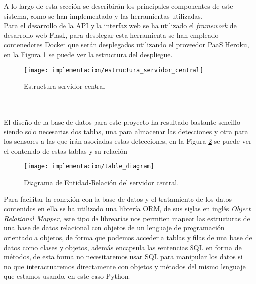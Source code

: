 \documentclass[../proyecto.tex]{subfiles}
\begin{document}
A lo largo de esta sección se describirán los principales componentes de este sistema, como se han implementado y las herramientas utilizadas.\\

Para el desarrollo de la API y la interfaz web se ha utilizado el \textit{framework} de desarrollo web Flask, para desplegar esta herramienta se han empleado contenedores Docker que serán desplegados utilizando el proveedor PaaS Heroku, en la Figura \ref{fig:estructura_servidor_central} se puede ver la estructura del despliegue.\\

\begin{figure}[H]
\centering
\texttt{[image: implementacion/estructura\_servidor\_central]}
\caption{Estructura servidor central }
\label{fig:estructura_servidor_central}
\end{figure}



\\

\\

El diseño de la base de datos para este proyecto ha resultado bastante sencillo siendo solo necesarias dos tablas, una para almacenar las detecciones y otra para los sensores a las que irán asociadas estas detecciones, en la Figura \ref{fig:table_diagram} se puede ver el contenido de estas tablas y su relación.

\begin{figure}[H]
\centering
\texttt{[image: implementacion/table\_diagram]}
\caption{Diagrama de Entidad-Relación del servidor central.}
\label{fig:table_diagram}
\end{figure}

Para facilitar la conexión con la base de datos y el tratamiento de los datos contenidos en ella se ha utilizado una librería ORM, de sus siglas en inglés \textit{Object Relational Mapper}, este tipo de librearías nos permiten mapear las estructuras de una base de datos relacional con objetos de un lenguaje de programación orientado a objetos, de forma que podemos acceder a tablas y filas de una base de datos como clases y objetos, además encapsula las sentencias SQL en forma de métodos, de esta forma no necesitaremos usar SQL para manipular los datos si no que interactuaremos directamente con objetos y métodos del mismo lenguaje que estamos usando, en este caso Python.\\
\end{document}
